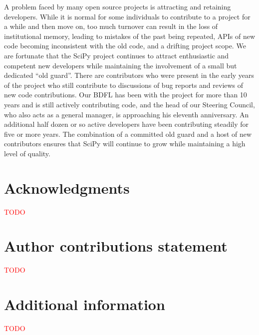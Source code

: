 \documentclass[fleqn,10pt]{wlscirep}
\newcommand{\fixme}[1]{\textcolor{red}{{#1}}}
\begin{document}
A problem faced by many open source projects is attracting and retaining developers. While it is normal for some individuals to contribute to a project for a while and then move on, too much turnover can result in the loss of institutional memory, leading to mistakes of the past being repeated, APIs of new code becoming inconsistent with the old code, and a drifting project scope.
We are fortunate that the SciPy project continues to attract enthusiastic and competent new developers while maintaining the involvement of a small but dedicated ``old guard''. There are contributors who were present in the early years of the project who still contribute to discussions of bug reports and reviews of new code contributions. Our BDFL has been with the project for more than 10 years and is still actively contributing code, and the head of our Steering Council, who also acts as a general manager, is approaching his eleventh anniversary. An additional half dozen or so active developers have been contributing steadily for five or more years. The combination of a committed old guard and a host of new contributors ensures that SciPy will continue to grow while maintaining a high level of quality.



\section*{Acknowledgments}

\fixme{TODO}


\section*{Author contributions statement}

\fixme{TODO}


\section*{Additional information}

\fixme{TODO}
\end{document}

